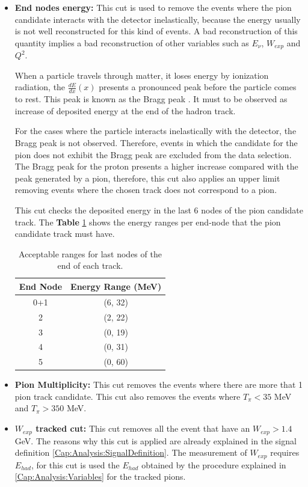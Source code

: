 \begin{itemize}
    
    \item \textbf{End nodes energy:} This cut is used to remove the events where the pion candidate interacts with the detector inelastically, because the energy usually is not well reconstructed for this kind of events. A bad reconstruction of this quantity implies a bad reconstruction of other variables such as $E_\nu$, $W_{exp}$ and $Q^2$. 

    When a particle travels through matter, it loses energy by ionization radiation, the $\frac{dE}{dx}(x)$ presents a pronounced peak before the particle comes to rest. This peak is known as the Bragg peak \cite{BraggCurves}. It must to be observed as increase of deposited energy at the end of the hadron track. 

    For the cases where the particle interacts inelastically with the detector, the Bragg peak is not observed. Therefore, events in which the candidate for the pion does not exhibit the Bragg peak are excluded from the data selection. The Bragg peak for the proton presents a higher increase compared with the peak generated by a pion, therefore, this cut also applies an upper limit removing events where the chosen track does not correspond to a pion. 

    This cut checks the deposited energy in the last 6 nodes of the pion candidate track. The \textbf{Table} \ref{tab:Analysis:Cuts:EndnodeCuts} shows the energy ranges per end-node that the pion candidate track must have.  

    \begin{table}[]
        \centering
        \begin{tabular}{c|c}
            End Node & Energy Range (MeV)\\ \hline
            0+1      & (6, 32) \\
            2        & (2, 22) \\
            3        & (0, 19) \\
            4        & (0, 31) \\
            5        & (0, 60) \\
        \end{tabular}
        \caption{Acceptable ranges for last nodes of the end of each track.}
        \label{tab:Analysis:Cuts:EndnodeCuts}
    \end{table}

    
    \item \textbf{Pion Multiplicity:} This cut removes the events where there are more that 1 pion track candidate. This cut also removes the events where $T_\pi < 35$ MeV and $T_\pi > 350$ MeV. 
    \item \textbf{$W_{exp}$ tracked cut:} This cut removes all the event that have an $W_{exp} > 1.4$ GeV. The reasons why this cut is applied are already explained in the signal definition \ref{Cap:Analysis:SignalDefinition}. The measurement of $W_{exp}$ requires $E_{had}$, for this cut is used the $E_{had}$ obtained by the procedure explained in \ref{Cap:Analysis:Variables} for the tracked pions. 
    
\end{itemize}

